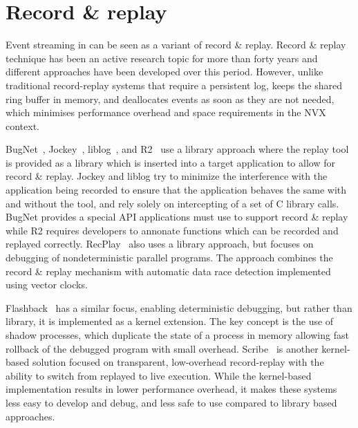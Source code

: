 \section{Record \& replay}
\label{related:record}

Event streaming in \varan can be seen as a variant of record \& replay. Record
\& replay technique has been an active research topic for more than forty years
and different approaches have been developed over this period. However, unlike
traditional record-replay systems that require a persistent log, \varan keeps
the shared ring buffer in memory, and deallocates events as soon as they are
not needed, which minimises performance overhead and space requirements in the
NVX context.


BugNet~\cite{bugnet}, Jockey~\cite{jockey}, liblog~\cite{geels06}, and
R2~\cite{r2} use a library approach where the replay tool is provided as a
library which is inserted into a target application to allow for record \&
replay. Jockey and liblog try to minimize the interference with the application
being recorded to ensure that the application behaves the same with and without
the tool, and rely solely on intercepting of a set of C library calls. BugNet
provides a special API applications must use to support record \& replay while
R2 requires developers to annonate functions which can be recorded and replayed
correctly. RecPlay~\cite{recplay} also uses a library approach, but focuses on
debugging of nondeterministic parallel programs. The approach combines the
record \& replay mechanism with automatic data race detection implemented using
vector clocks.

Flashback~\cite{flashback} has a similar focus, enabling deterministic
debugging, but rather than library, it is implemented as a kernel extension.
The key concept is the use of shadow processes, which duplicate the state of a
process in memory allowing fast rollback of the debugged program with small
overhead. Scribe~\cite{scribe} is another kernel-based solution focused on
transparent, low-overhead record-replay with the ability to switch from
replayed to live execution. While the kernel-based implementation results in
lower performance overhead, it makes these systems less easy to develop and
debug, and less safe to use compared to library based approaches.

